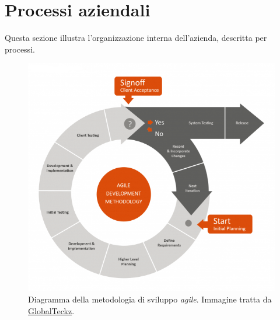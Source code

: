 \section{Processi aziendali}
Questa sezione illustra l'organizzazione interna dell'azienda, descritta per processi.
\begin{figure}[h]
\centering
\includegraphics[scale=0.65]{immagini/agileo}
\caption{Diagramma della metodologia di sviluppo \emph{agile}. Immagine tratta da \href{http://blogs.globalteckz.com/characteristics-of-agile-methodology-in-software-development/}{GlobalTeckz}.}
\label{fig:agile}
\end{figure}
